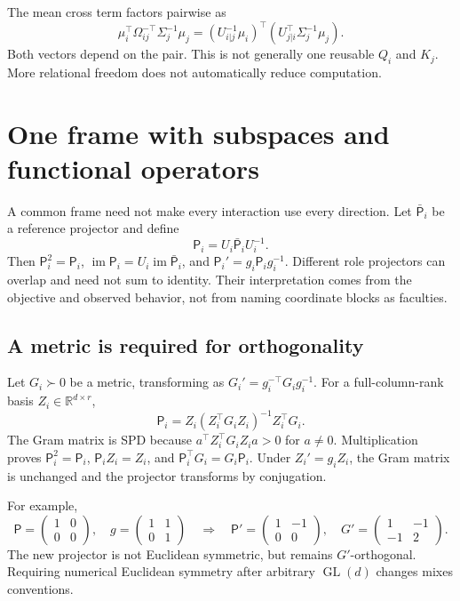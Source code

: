 \documentclass[11pt,letterpaper]{article}
\newcommand{\R}{\mathbb R}
\newcommand{\GL}{\operatorname{GL}}
\newcommand{\im}{\operatorname{im}}
\theoremstyle{remark}
\begin{document}
The mean cross term factors pairwise as
\begin{equation}
 \mu_i^\top\Omega_{ij}^{-\top}\Sigma_j^{-1}\mu_j
 =(U_{i|j}^{-1}\mu_i)^\top(U_{j|i}^\top\Sigma_j^{-1}\mu_j).
\end{equation}
Both vectors depend on the pair. This is not generally one reusable $Q_i$ and $K_j$. More relational freedom does not automatically reduce computation.



\section{One frame with subspaces and functional operators}
\label{sec:subspaces}
A common frame need not make every interaction use every direction. Let $\bar{\mathsf P}_i$ be a reference projector and define
\begin{equation}
 \mathsf P_i=U_i\bar{\mathsf P}_iU_i^{-1}.
\end{equation}
Then $\mathsf P_i^2=\mathsf P_i$, $\im\mathsf P_i=U_i\im\bar{\mathsf P}_i$, and $\mathsf P_i'=g_i\mathsf P_ig_i^{-1}$. Different role projectors can overlap and need not sum to identity. Their interpretation comes from the objective and observed behavior, not from naming coordinate blocks as faculties.

\subsection{A metric is required for orthogonality}
Let $G_i\succ0$ be a metric, transforming as $G_i'=g_i^{-\top}G_ig_i^{-1}$. For a full-column-rank basis $Z_i\in\R^{d\times r}$,
\begin{equation}
 \boxed{\mathsf P_i=Z_i(Z_i^\top G_iZ_i)^{-1}Z_i^\top G_i.}
 \label{eq:metric-proj}
\end{equation}
The Gram matrix is SPD because $a^\top Z_i^\top G_iZ_ia>0$ for $a\ne0$. Multiplication proves $\mathsf P_i^2=\mathsf P_i$, $\mathsf P_iZ_i=Z_i$, and $\mathsf P_i^\top G_i=G_i\mathsf P_i$. Under $Z_i'=g_iZ_i$, the Gram matrix is unchanged and the projector transforms by conjugation.

For example,
\begin{equation}
 \mathsf P=\begin{pmatrix}1&0\\0&0\end{pmatrix},\quad
 g=\begin{pmatrix}1&1\\0&1\end{pmatrix}
 \quad\Longrightarrow\quad
 \mathsf P'=\begin{pmatrix}1&-1\\0&0\end{pmatrix},\quad
 G'=\begin{pmatrix}1&-1\\-1&2\end{pmatrix}.
\end{equation}
The new projector is not Euclidean symmetric, but remains $G'$-orthogonal. Requiring numerical Euclidean symmetry after arbitrary $\GL(d)$ changes mixes conventions.
\end{document}
